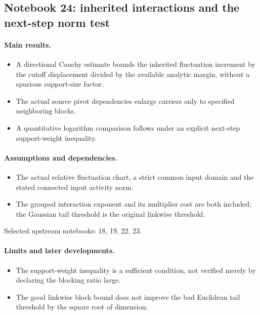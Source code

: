 \subsection{Notebook 24: inherited interactions and the next-step norm test}
\label{hnc-24}
\noindent{}\par

\paragraph{Main results.}
\begin{itemize}
\item A directional Cauchy estimate bounds the inherited fluctuation increment by the cutoff displacement divided by the available analytic margin, without a spurious support-size factor.
\item The actual source pivot dependencies enlarge carriers only to specified neighboring blocks.
\item A quantitative logarithm comparison follows under an explicit next-step support-weight inequality.
\end{itemize}

\paragraph{Assumptions and dependencies.}
\begin{itemize}
\item The actual relative fluctuation chart, a strict common input domain and the stated connected input activity norm.
\item The grouped interaction exponent and its multiplier cost are both included; the Gaussian tail threshold is the original linkwise threshold.
\end{itemize}

Selected upstream notebooks: 18, 19, 22, 23.\par

\paragraph{Limits and later developments.}
\begin{itemize}
\item The support-weight inequality is a sufficient condition, not verified merely by declaring the blocking ratio large.
\item The good linkwise block bound does not improve the bad Euclidean tail threshold by the square root of dimension.
\end{itemize}

